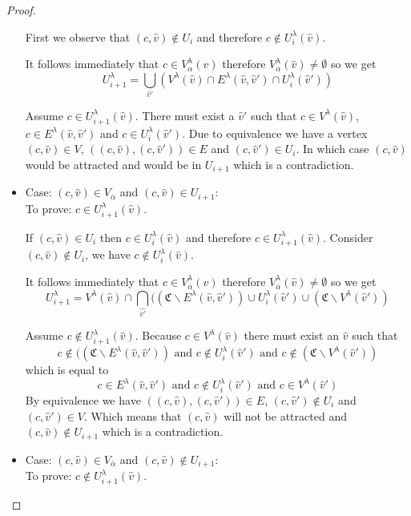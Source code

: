 \begin{lemma}
\begin{proof}
\begin{itemize}
			
			First we observe that $(c,\hat{v}) \notin U_i$ and therefore $c \notin U^\lambda_i(\hat{v})$.
			
			It follows immediately that $c \in V^\lambda_{\alpha}(\hat{v})$ therefore $V^\lambda_{\alpha}(\hat{v}) \neq \emptyset$ so we get
			\[ U^\lambda_{i+1} =\bigcup_{\hat{v}'} (V^\lambda(\hat{v}) \cap E^\lambda(\hat{v},\hat{v}') \cap U^\lambda_i(\hat{v}')) \]
			
			Assume $c \in U^\lambda_{i+1}(\hat{v})$. There must exist a $\hat{v}'$ such that $c \in V^\lambda(\hat{v})$, $c \in E^\lambda(\hat{v},\hat{v}')$ and $c \in U^\lambda_i(\hat{v}')$. Due to equivalence we have a vertex $(c,\hat{v}) \in V$, $((c,\hat{v}),(c,\hat{v}')) \in E$ and $(c,\hat{v}') \in U_i$. In which case $(c,\hat{v})$ would be attracted and would be in $U_{i+1}$ which is a contradiction.
			\item Case: $(c, \hat{v}) \in V_{\overline{\alpha}}$ and $(c,\hat{v}) \in U_{i+1}$:\\
			To prove: $c \in U^\lambda_{i+1}(\hat{v})$.
			
			If $(c,\hat{v}) \in U_i$ then $c \in U^\lambda_i(\hat{v})$ and therefore $c \in U^\lambda_{i+1}(\hat{v})$. Consider $(c,\hat{v}) \notin U_i$, we have $c \notin U^\lambda_i(\hat{v})$.
			
			It follows immediately that $c \in V^\lambda_{\overline{\alpha}}(\hat{v})$ therefore $V^\lambda_{\overline{\alpha}}(\hat{v}) \neq \emptyset$ so we get
			\[ U^\lambda_{i+1} =V^\lambda(\hat{v}) \cap \bigcap_{\hat{v'}}((\mathfrak{C} \backslash E^\lambda(\hat{v},\hat{v}')) \cup U^\lambda_i(\hat{v}') \cup (\mathfrak{C}\backslash V^\lambda(\hat{v}')) \]
			
			Assume $c \notin U^\lambda_{i+1}(\hat{v})$. Because $c \in V^\lambda(\hat{v})$ there must exist an $\hat{v}$ such that
			\[ c \notin ((\mathfrak{C} \backslash E^\lambda(\hat{v},\hat{v}')) \text{ and } c \notin U^\lambda_i(\hat{v}') \text{ and } c \notin (\mathfrak{C}\backslash V^\lambda(\hat{v}')) \]
			which is equal to
			\[ c \in E^\lambda(\hat{v},\hat{v}') \text{ and } c \notin U^\lambda_i(\hat{v}') \text{ and } c \in V^\lambda(\hat{v}') \]
			By equivalence we have $((c,\hat{v}),(c,\hat{v}')) \in E$, $(c,\hat{v}') \notin U_i$ and $(c,\hat{v}') \in V$. Which means that $(c,\hat{v})$ will not be attracted and $(c,\hat{v}) \notin U_{i+1}$ which is a contradiction.
			\item Case: $(c, \hat{v}) \in V_{\overline{\alpha}}$ and $(c,\hat{v}) \notin U_{i+1}$:\\
			To prove: $c \notin U^\lambda_{i+1}(\hat{v})$.
			

\end{itemize}
\end{proof}
\end{lemma}

